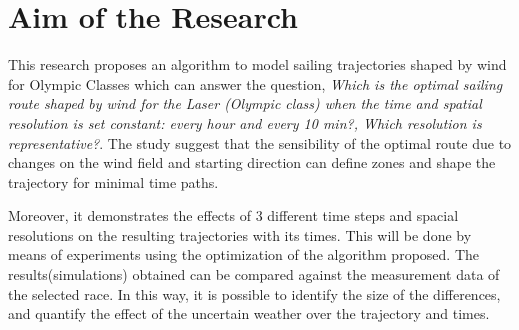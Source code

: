  \section{Aim of the Research}
This research proposes an algorithm to model sailing trajectories shaped by wind for Olympic Classes which %
can answer the question, \textit{Which is the optimal sailing route shaped by wind for the Laser (Olympic class) when the time and spatial resolution is set constant: every hour and every 10 min?, Which resolution is representative?}. The study suggest that the sensibility of the optimal route due to changes on the wind field and starting direction can define zones and shape the trajectory for minimal time paths. \par 

Moreover, it demonstrates the effects of 3 different time steps and spacial resolutions on the resulting trajectories with its times. This will be done by means of experiments using the optimization of the algorithm proposed. The results(simulations) obtained can be compared against the measurement data of the selected race. In this way, it is possible to identify the size of the differences, and quantify the effect of the uncertain weather over the trajectory and times.\par 

